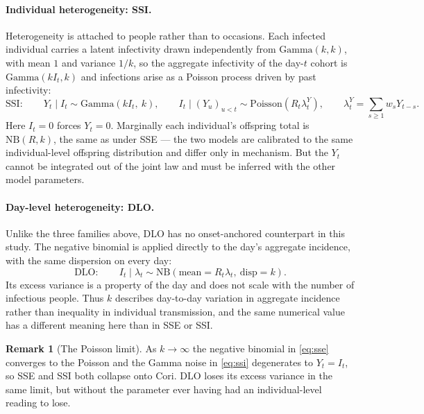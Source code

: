 \documentclass[11pt,a4paper]{article}
\theoremstyle{plain}
\theoremstyle{definition}
\newtheorem*{remark}{Remark}
\newcommand{\NB}{\mathrm{NB}}
\newcommand{\Pois}{\mathrm{Poisson}}
\newcommand{\Gam}{\mathrm{Gamma}}
\newcommand{\dlo}{DLO}
\newcommand{\sse}{SSE}
\newcommand{\ssi}{SSI}
\newcommand{\cori}{Cori}
\begin{document}
\paragraph{Individual heterogeneity: \ssi{}.} Heterogeneity is attached to people rather
than to occasions. Each infected individual carries a latent infectivity drawn independently from
$\Gam(k,k)$, with mean $1$ and variance $1/k$, so the aggregate infectivity of the day-$t$ cohort
is $\Gam(kI_t,k)$ and infections arise as a Poisson process driven by past infectivity:
\begin{equation}
  \text{\ssi{}}: \qquad
  Y_t \mid I_t \sim \Gam\!\left(kI_t,\ k\right),
  \qquad
  I_t \mid (Y_u)_{u<t} \sim \Pois\!\left(R_t\lambda^{Y}_t\right),
  \qquad
  \lambda^{Y}_t = \sum_{s\ge1} w_s Y_{t-s}.
  \label{eq:ssi}
\end{equation}
Here $I_t = 0$ forces $Y_t = 0$. Marginally each individual's offspring total is $\NB(R,k)$, the
same as under \sse{} --- the two models are calibrated to the same individual-level offspring
distribution and differ only in mechanism. But the $Y_t$ cannot be integrated out of the joint
law and must be inferred with the other model parameters.

\paragraph{Day-level heterogeneity: \dlo{}.} Unlike the three families above, \dlo{} has no
onset-anchored counterpart in this study. The negative binomial is applied directly to the day's
aggregate incidence, with the same dispersion on every day:
\begin{equation}
  \text{\dlo{}}: \qquad
  I_t \mid \lambda_t \sim \NB\!\left(\text{mean}=R_t\lambda_t,\ \text{disp}=k\right).
  \label{eq:dlo}
\end{equation}
Its excess variance is a property of the day and does not scale with the number of infectious
people. Thus $k$ describes day-to-day variation in aggregate incidence rather than inequality in
individual transmission, and the same numerical value has a different meaning here than in
\sse{} or \ssi{}.

\begin{remark}[The Poisson limit]
\label{rmk:naive-limit}
As $k\to\infty$ the negative binomial in \eqref{eq:sse} converges to the Poisson and the Gamma
noise in \eqref{eq:ssi} degenerates to $Y_t = I_t$, so \sse{} and \ssi{} both collapse onto
\cori{}. \dlo{} loses its excess variance in the same limit, but without the parameter ever
having had an individual-level reading to lose.
\end{remark}
\end{document}
